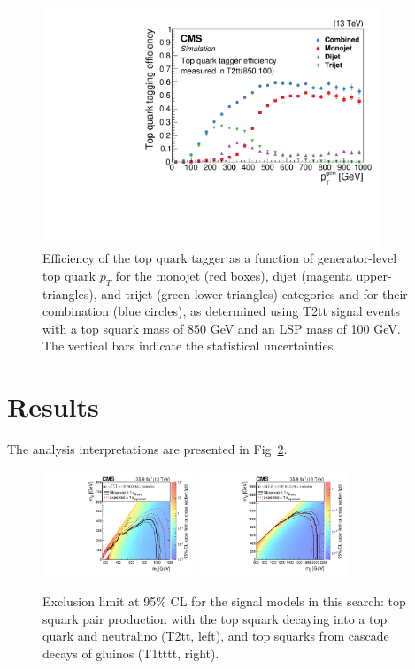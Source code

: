 \documentclass{PoS}
\begin{document}
\begin{figure}[htbp]
 \begin{center}
  \includegraphics[width=0.90\textwidth]{figures/Tagger_Paper.pdf}
 \end{center}
 \caption{Efficiency of the top quark tagger as a function of generator-level top quark $p_{T}$ for
the monojet (red boxes), dijet (magenta upper-triangles), and trijet (green lower-triangles) categories
and for their combination (blue circles), as determined using T2tt signal events with a
top squark mass of 850 GeV and an LSP mass of 100 GeV. The vertical bars indicate the statistical
uncertainties.}
 \label{fig:c4ttefftight}
\end{figure}

\section{Results}

The analysis interpretations are presented in Fig~\ref{fig:signal_results}. 

\begin{figure}[ht!]
 \begin{centering}
  \includegraphics[width=0.40\textwidth]{figures/Covered_T2tt_OnlyXSEC.pdf}
  \includegraphics[width=0.40\textwidth]{figures/T1tttt_OnlyXSEC.pdf}
  \caption{Exclusion limit at 95\% CL for the signal models in this search: top squark pair production with the top squark decaying into a top quark and neutralino (T2tt, left), and top squarks from cascade decays of gluinos (T1tttt, right).}
  \label{fig:signal_results}
 \end{centering}
\end{figure}
\end{document}
